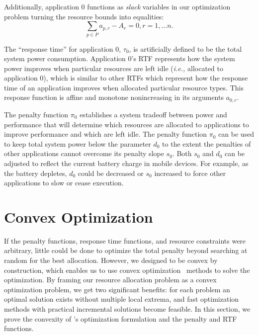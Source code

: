 Additionally, application 0 functions as \emph{slack} variables in our optimization problem turning the resource bounds into equalities:
\begin{equation}
\sum_{p\in P} a_{p,r} - A_r = 0, r = 1,\dots n.
\end{equation}

The ``response time'' for application 0, $\tau_0$, is artificially
defined to be the total system power consumption.  Application 0's RTF represents how the system power improves when particular resources are left idle (\emph{i.e.,} allocated to application 0), which is similar to other RTFs which represent how the response time of an application improves when allocated particular resource types. This response function is affine and monotone nonincreasing in its arguments $a_{0,r}$.

The penalty function $\pi_0$ establishes a system tradeoff between
power and performance that will determine which resources are
allocated to applications to improve performance and which are left
idle.  The penalty function $\pi_0$ can be used to keep total system
power below the parameter $d_0$ to the extent the penalties of other
applications cannot overcome its penalty slope $s_0$. Both $s_0$ and
$d_0$ can be adjusted to reflect the current battery charge in mobile
devices. For example, as the battery depletes, $d_0$ could be decreased or $s_0$ increased
to force other applications to slow or cease execution.


\section{Convex Optimization}
If the penalty functions, response time functions, and resource
constraints were arbitrary, little could be done to optimize the total
penalty beyond searching at random for the best allocation.  However, we designed \pacora to be convex by construction, which enables us to use convex optimization~\cite{BoVa} methods to solve the optimization. 
By framing our resource allocation problem as a convex optimization problem, we get two significant benefits: for each problem an optimal
solution exists without multiple local extrema, and fast optimization methods with practical incremental solutions become feasible.  In this section, we prove the convexity of \pacora's optimization formulation and the penalty and RTF functions. 

